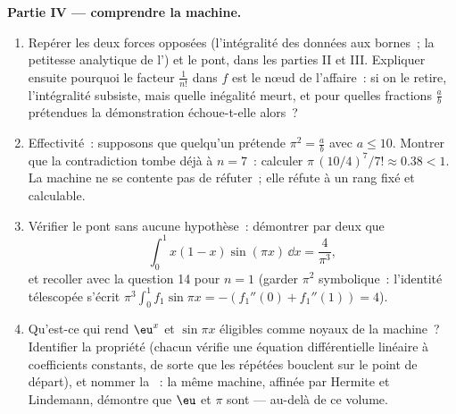 \begin{problem}
\medskip
\noindent\textbf{Partie IV --- comprendre la machine.}
\begin{enumerate}[resume]
  \item Repérer les deux forces opposées (l'intégralité des données
        aux bornes~; la petitesse analytique de l') et le
        pont, dans les parties II et III. Expliquer ensuite pourquoi
        le facteur $\frac{1}{n!}$ dans $f$ est le nœud de
        l'affaire~: si on le retire, l'intégralité subsiste, mais
        quelle inégalité meurt, et pour quelles fractions $\frac ab$
        prétendues la démonstration échoue-t-elle alors~?
  \item Effectivité~: supposons que quelqu'un prétende $\pi^2 =
        \frac ab$ avec $a \leq 10$. Montrer que la contradiction
        tombe déjà à $n = 7$~: calculer $\pi\,(10/4)^7/7! \approx
        0.38 < 1$. La machine ne se contente pas de réfuter~; elle
        réfute à un rang fixé et calculable.
  \item Vérifier le pont sans aucune hypothèse~: démontrer par deux
         que
        \[
        \int_0^1 x(1 - x)\sin(\pi x)\,\dd x = \frac{4}{\pi^3},
        \]
        et recoller avec la question 14 pour $n = 1$ (garder
        $\pi^2$ symbolique~: l'identité télescopée s'écrit $\pi^3
        \int_0^1 f_1 \sin \pi x = -(f_1''(0) + f_1''(1)) = 4$).
  \item Qu'est-ce qui rend $\eu^x$ et $\sin \pi x$ éligibles comme
        noyaux de la machine~? Identifier la propriété (chacun
        vérifie une équation différentielle linéaire à coefficients
        constants, de sorte que les 
        répétées bouclent sur le point de départ), et nommer la
        ~: la même machine, affinée par Hermite et
        Lindemann, démontre que $\eu$ et $\pi$ sont
        \emph{} --- au-delà de ce volume.
\end{enumerate}


\end{problem}
